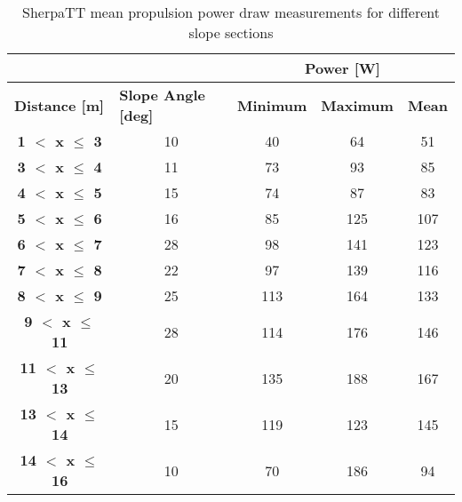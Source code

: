 \begin{table}[h]
\centering
\caption{SherpaTT mean propulsion power draw measurements for different slope sections}
\label{tab:sherpatt-upslope-terrain-local-media-measurement-summary}
\begin{tabular}{cc|c|c|c|}
\cline{3-5}
\multicolumn{1}{l}{} & \multicolumn{1}{l|}{} & \multicolumn{3}{c|}{\textbf{Power {[}W{]}}} \\ \hline
\multicolumn{1}{|l|}{\textbf{Distance {[}m{]}}} & \multicolumn{1}{l|}{\textbf{Slope Angle {[}deg{]}}} & \multicolumn{1}{l|}{\textbf{Minimum}} & \multicolumn{1}{l|}{\textbf{Maximum}} & \multicolumn{1}{l|}{\textbf{Mean}} \\ \hline
\multicolumn{1}{|c|}{\textbf{1 $<$ x $\leq$ 3}} & 10 & 40 & 64 & 51 \\ \hline
\multicolumn{1}{|c|}{\textbf{3 $<$ x $\leq$ 4}} & 11 & 73 & 93 & 85 \\ \hline
\multicolumn{1}{|c|}{\textbf{4 $<$ x $\leq$ 5}} & 15 & 74 & 87 & 83 \\ \hline
\multicolumn{1}{|c|}{\textbf{5 $<$ x $\leq$ 6}} & 16 & 85 & 125 & 107 \\ \hline
\multicolumn{1}{|c|}{\textbf{6 $<$ x $\leq$ 7}} & 28 & 98 & 141 & 123 \\ \hline
\multicolumn{1}{|c|}{\textbf{7 $<$ x $\leq$ 8}} & 22 & 97 & 139 & 116 \\ \hline
\multicolumn{1}{|c|}{\textbf{8 $<$ x $\leq$ 9}} & 25 & 113 & 164 & 133 \\ \hline
\multicolumn{1}{|c|}{\textbf{9 $<$ x $\leq$ 11}} & 28 & 114 & 176 & 146 \\ \hline
\multicolumn{1}{|c|}{\textbf{11 $<$ x $\leq$ 13}} & 20 & 135 & 188 & 167 \\ \hline
\multicolumn{1}{|c|}{\textbf{13 $<$ x $\leq$ 14}} & 15 & 119 & 123 & 145 \\ \hline
\multicolumn{1}{|c|}{\textbf{14 $<$ x $\leq$ 16}} & 10 & 70 & 186 & 94 \\ \hline
\end{tabular}
\end{table}
